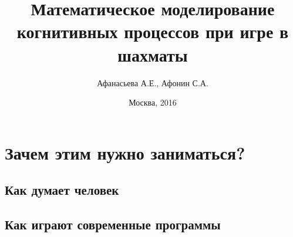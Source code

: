 \documentclass{beamer}
\begin{document}
\title{Математическое моделирование\\ когнитивных процессов при игре в шахматы} 
\author{Афанасьева А.Е., Афонин С.А.}
\date{Москва, 2016} 
\frame{\titlepage} 


%
\newcommand{\showDiagram}[2]{%
      \chessboard[%
      setpieces={#1},%
      arrow=stealth,%
      linewidth=.25ex,%
      padding=1ex,%
      color=red!55!white,%
      pgfstyle=straightmove,%
      shortenstart=1ex,%
      showmover=false,%
      markmoves={#2},%
      padding=10ex,%
      shortenend=1ex%
      ]%
}


\section[Зачем]{Зачем этим нужно заниматься?}
\subsection{Как думает человек}



\subsection{Как играют современные программы}




  
\end{document}
